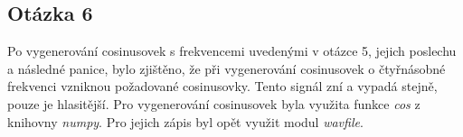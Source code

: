 \documentclass[a4paper,12pt]{article}
\begin{document}
\subsection{Otázka 6}
\begin{figure}[h]
\centering
{}
\end{figure}
Po vygenerování cosinusovek s frekvencemi uvedenými v otázce 5, jejich poslechu a následné panice, bylo zjištěno, že při vygenerování cosinusovek o čtyřnásobné frekvenci vzniknou požadované cosinusovky. Tento signál zní a vypadá stejně, pouze je hlasitější. Pro vygenerování cosinusovek byla využita funkce \emph{cos} z knihovny \emph{numpy}. Pro jejich zápis byl opět využit modul \emph{wavfile}.

\newpage
\end{document}

